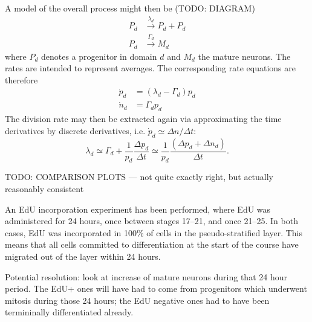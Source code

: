 \documentclass[10pt,english]{article}
\begin{document}
A model of the overall process might then be (TODO: DIAGRAM)
\begin{align*}
P_d &\overset{\lambda_d}{\longrightarrow} P_d + P_d \\
P_d &\overset{\Gamma_d}{\longrightarrow} M_d
\end{align*}
where $P_d$ denotes a progenitor in domain $d$ and $M_d$ the mature neurons. The rates are intended to represent averages. The corresponding rate equations are therefore
\begin{align*}
\dot{p}_d &= (\lambda_d - \Gamma_d) p_d  \\
\dot{n}_d &= \Gamma_d p_d
\end{align*}
The division rate may then be extracted again via approximating the time derivatives by discrete derivatives, i.e. $\dot{p}_d \simeq \Delta n / \Delta t$: $$ \lambda_d \simeq \Gamma_d + \frac{1}{p_d}\frac{\Delta p_d}{\Delta t} \simeq \frac{1}{p_d} \frac{\left(\Delta p_d + \Delta n_d \right)}{\Delta t}.$$

TODO: COMPARISON PLOTS --- not quite exactly right, but actually reasonably consistent

An EdU incorporation experiment has been performed, where EdU was administered for 24 hours, once between stages 17--21, and once 21--25. In both cases, EdU was incorporated in 100\% of cells in the pseudo-stratified layer. This means that all cells committed to differentiation at the start of the course have migrated out of the layer within 24 hours.

Potential resolution: look at increase of mature neurons during that 24 hour period. The EdU+ ones will have had to come from progenitors which underwent mitosis during those 24 hours; the EdU negative ones had to have been termininally differentiated already.
\end{document}
